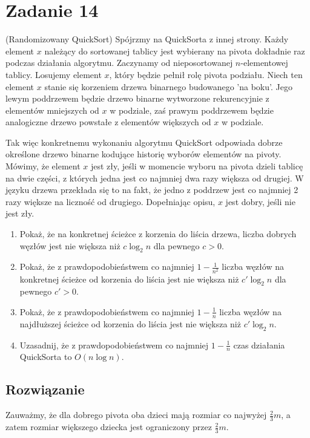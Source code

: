 \section{Zadanie 14}
(Randomizowany QuickSort) Spójrzmy na QuickSorta z innej strony. Każdy element \(x\) należący do sortowanej tablicy jest wybierany na pivota dokładnie raz podczas działania algorytmu. Zaczynamy od nieposortowanej \(n\)-elementowej tablicy. Losujemy element \(x\), który będzie pełnił rolę pivota podziału. Niech ten element \(x\) stanie się korzeniem drzewa binarnego budowanego 'na boku'. Jego lewym poddrzewem będzie drzewo binarne wytworzone rekurencyjnie z elementów mniejszych od \(x\) w podziale, zaś prawym poddrzewem będzie analogiczne drzewo powstałe z elementów większych od \(x\) w podziale.

Tak więc konkretnemu wykonaniu algorytmu QuickSort odpowiada dobrze określone drzewo binarne kodujące historię wyborów elementów na pivoty. Mówimy, że element \(x\) jest zły, jeśli w momencie wyboru na pivota dzieli tablicę na dwie części, z których jedna jest co najmniej dwa razy większa od drugiej. W języku drzewa przekłada się to na fakt, że jedno z poddrzew jest co najmniej 2 razy większe na liczność od drugiego. Dopełniając opisu, \(x\) jest dobry, jeśli nie jest zły.

\bigskip

\begin{enumerate}
	\item Pokaż, że na konkretnej ścieżce z korzenia do liścia drzewa, liczba dobrych węzłów jest nie większa niż \(c \log_2 n\) dla pewnego \(c > 0\).
	\item Pokaż, że z prawdopodobieństwem co najmniej \(1 - \frac{1}{n^2}\) liczba węzłów na konkretnej ścieżce od korzenia do liścia jest nie większa niż \(c' \log_2 n\) dla pewnego \(c' > 0\).
	\item Pokaż, że z prawdopodobieństwem co najmniej \(1 - \frac{1}{n}\) liczba węzłów na najdłuższej ścieżce od korzenia do liścia jest nie większa niż \(c' \log_2 n\).
	\item Uzasadnij, że z prawdopodobieństwem co najmniej \(1 - \frac{1}{n}\) czas działania QuickSorta to \(O(n \log n)\).
\end{enumerate}

\subsection*{Rozwiązanie}
Zauważmy, że dla dobrego pivota oba dzieci mają rozmiar co najwyżej \(\frac{2}{3}m\), a zatem rozmiar większego dziecka jest ograniczony przez \(\frac{2}{3}m\).

